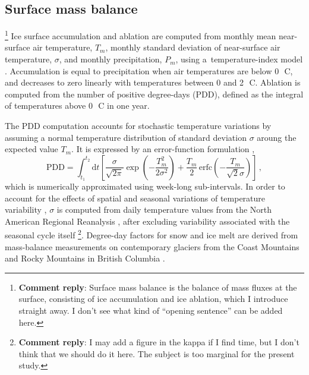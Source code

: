 \documentclass[tc, manuscript]{copernicus}
\newcommand{\renote}[1]{\footnote{\textbf{Comment reply}: #1}}
\begin{document}
\subsection{Surface mass balance}
\label{sec:surface}

\renote{
    Surface mass balance is the balance of mass fluxes at the surface,
    consisting of ice accumulation and ice ablation, which I introduce straight
    away. I don't see what kind of ``opening sentence'' can be added here.}
Ice surface accumulation and ablation are computed from monthly mean
near-surface air temperature, $T_m$, monthly standard deviation of near-surface
air temperature, $\sigma$, and monthly precipitation, $P_m$, using
a~temperature-index model \citep[e.g.,][]{Hock.2003}. Accumulation is equal to
precipitation when air temperatures are below 0\,\unit{{\degree}C}, and
decreases to zero linearly with temperatures between 0 and
2\,\unit{{\degree}C}. Ablation is computed from the number of positive
degree-days (PDD), defined as the integral of temperatures above
0\,\unit{{\degree}C} in one year.

The PDD computation accounts for stochastic temperature variations by assuming
a normal temperature distribution of standard deviation $\sigma$ aroung the
expected value $T_m$. It is expressed by an error-function formulation
\citep{Calov.Greve.2005},
\begin{equation}
    \label{eqn:calovgreve}
    \mathrm{PDD} = \int_{t_1}^{t_2} \mathrm{d}t
        \left[\frac{\sigma}{\sqrt{2\pi}}
                \exp\left({-\frac{T_{m}^2}{2\sigma^2}}\right)
              + \frac{T_{m}}{2} \, \mathrm{erfc}
                \left(-\frac{T_{m}}{\sqrt{2}\sigma}\right)\right] \,,
\end{equation}
which is numerically approximated using week-long sub-intervals. In order to
account for the effects of spatial and seasonal variations of temperature
variability \citep{Seguinot.2013}, $\sigma$ is computed from daily temperature
values from the North American Regional Reanalysis
\citep[NARR,][]{Mesinger.etal.2006}, after excluding variability associated
with the seasonal cycle itself \citep[cf.][]{Seguinot.Rogozhina.2014}\renote{
    I may add a figure in the kappa if I find time, but I don't think that we
    should do it here. The subject is too marginal for the present study.}.
Degree-day factors for snow and ice melt are derived from
mass-balance measurements on contemporary glaciers from the Coast Mountains and
Rocky Mountains in British Columbia
\citep[Table~\ref{tab:params};][]{Shea.etal.2009}.
\end{document}

